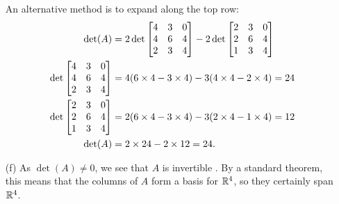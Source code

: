 \documentclass[a4paper]{article}
\begin{document}
\begin{solution}
\begin{itemize}
   An alternative method is to expand along the top row:
   \begin{align*}
    \det(A) &= 2\det\left[\begin{matrix} 4&3&0 \\ 4&6&4 \\ 2&3&4 \end{matrix}\right] 
              -2\det\left[\begin{matrix} 2&3&0 \\ 2&6&4 \\ 1&3&4 \end{matrix}\right] \\
    \det\left[\begin{matrix} 4&3&0 \\ 4&6&4 \\ 2&3&4 \end{matrix}\right] 
     &= 4(6\times 4 - 3\times 4) 
       -3(4\times 4 - 2\times 4) = 24 \\
    \det\left[\begin{matrix} 2&3&0 \\ 2&6&4 \\ 1&3&4 \end{matrix}\right]
     &= 2(6\times 4 - 3\times 4)
       -3(2\times 4 - 1\times 4) = 12 \\
    \det(A) &= 2\times 24 - 2\times 12 = 24.
   \end{align*}
  \item[(f)] As $\det(A)\neq 0$, we see that $A$ is invertible
   .  By a standard theorem, this means that the columns of $A$
   form a basis for ${\mathbb{R}}^4$, so they certainly span ${\mathbb{R}}^4$.\mk
 \end{itemize}
\end{solution}
\end{document}

